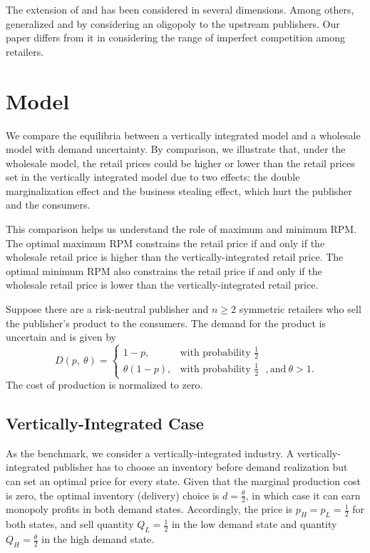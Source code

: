 \documentclass[12pt]{article}
\begin{document}
The extension of \cite{deneckereDemandUncertaintyPrice1997} and \cite{deneckereDemandUncertaintyPrice1997} has been considered in several dimensions. Among others, \cite{wangResalePriceMaintenance2004} generalized \cite{deneckereDemandUncertaintyPrice1997} and \cite{deneckereDemandUncertaintyPrice1997} by considering an oligopoly to the upstream publishers. Our paper differs from it in considering the range of imperfect competition among retailers.


\section{Model}\label{sec:linear_demand_model}

We compare the equilibria between a vertically integrated model and a wholesale model with demand uncertainty. By comparison, we illustrate that, under the wholesale model, the retail prices could be higher or lower than the retail prices set in the vertically integrated model due to two effects: the double marginalization effect and the business stealing effect, which hurt the publisher and the consumers. 

This comparison helps us understand the role of maximum and minimum RPM. The optimal maximum RPM constrains the retail price if and only if the wholesale retail price is higher than the vertically-integrated retail price. The optimal minimum RPM also constrains the retail price if and only if the wholesale retail price is lower than the vertically-integrated retail price.

Suppose there are a risk-neutral publisher and $n \geq 2$ symmetric retailers who sell the publisher's product to the consumers. The demand for the product is uncertain and is given by
\begin{equation}
 \  D (p, \ \theta)=
\begin{cases}
 1-p,  & \text{with probability  $\frac{1}{2}$}\\
 \theta(1-p), & \text{with probability $\frac{1}{2}$ }, \text{and} \ \theta > 1.
 \end{cases}
\end{equation}
The cost of production is normalized to zero.

\subsection{Vertically-Integrated Case} As the benchmark, we consider a vertically-integrated industry. A vertically-integrated publisher has to choose an inventory before demand realization but can set an optimal price for every state. 
Given that the marginal production cost is zero, the optimal inventory (delivery) choice is $d = \frac{\theta}{2}$, in which case it can earn monopoly profits in both demand states.  Accordingly, the price is $p_{H} = p_{L} = \frac{1}{2}$ for both states, and sell quantity $Q_{L} = \frac{1}{2}$ in the low demand state and quantity $Q_{H} = \frac{\theta}{2}$ in the high demand state. 
\end{document}
